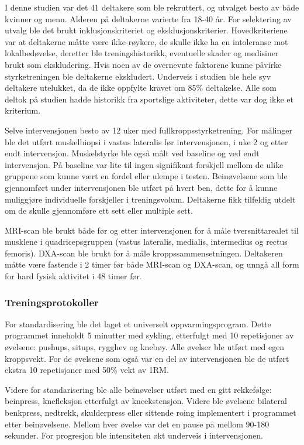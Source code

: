 \documentclass[
  letterpaper,
  DIV=11,
  numbers=noendperiod]{scrartcl}
\begin{document}
I denne studien var det 41 deltakere som ble rekruttert, og utvalget
besto av både kvinner og menn. Alderen på deltakerne varierte fra 18-40
år. For selektering av utvalg ble det brukt inklusjonskriteriet og
eksklusjonskriterier. Hovedkriteriene var at deltakerne måtte være
ikke-røykere, de skulle ikke ha en intoleranse mot lokalbedøvelse,
deretter ble treningshistorikk, eventuelle skader og medisiner brukt som
ekskludering. Hvis noen av de overnevnte faktorene kunne påvirke
styrketreningen ble deltakerne ekskludert. Underveis i studien ble hele
syv deltakere utelukket, da de ikke oppfylte kravet om 85\% deltakelse.
Alle som deltok på studien hadde historikk fra sportslige aktiviteter,
dette var dog ikke et kriterium.

Selve intervensjonen besto av 12 uker med fullkroppsstyrketrening. For
målinger ble det utført muskelbiopsi i vastus lateralis før
intervensjonen, i uke 2 og etter endt intervensjon. Muskelstyrke ble
også målt ved baseline og ved endt intervensjon. På baseline var lite
til ingen signifikant forskjell mellom de ulike gruppene som kunne vært
en fordel eller ulempe i testen. Beinøvelsene som ble gjennomført under
intervensjonen ble utført på hvert ben, dette for å kunne muliggjøre
individuelle forskjeller i treningsvolum. Deltakerne fikk tilfeldig
utdelt om de skulle gjennomføre ett sett eller multiple sett.

MRI-scan ble brukt både før og etter intervensjonen for å måle
tversnittarealet til musklene i quadricepsgruppen (vastus lateralis,
medialis, intermedius og rectus femoris). DXA-scan ble brukt for å måle
kroppssammensetningen. Deltakeren måtte være fastende i 2 timer før både
MRI-scan og DXA-scan, og unngå all form for hard fysisk aktivitet i 48
timer før.

\hypertarget{treningsprotokoller}{%
\subsubsection{Treningsprotokoller}\label{treningsprotokoller}}

For standardisering ble det laget et universelt oppvarmingsprogram.
Dette programmet inneholdt 5 minutter med sykling, etterfulgt med 10
repetisjoner av øvelsene: pushups, situps, rygghev og knebøy. Alle
øvelser ble utført med egen kroppsvekt. For de øvelsene som også var en
del av intervensjonen ble de utført ekstra 10 repetisjoner med 50\% vekt
av 1RM.

Videre for standarisering ble alle beinøvelser utført med en gitt
rekkefølge: beinpress, knefleksjon etterfulgt av kneekstensjon. Videre
ble øvelsene bilateral benkpress, nedtrekk, skulderpress eller sittende
roing implementert i programmet etter beinøvelsene. Mellom hver øvelse
var det en pause på mellom 90-180 sekunder. For progresjon ble
intensiteten økt underveis i intervensjonen.
\end{document}
